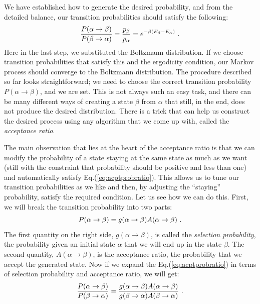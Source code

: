 \par
We have established how to generate the desired probability, and from the detailed balance, our transition probabilities should satisfy the following:
\begin{equation}
	\frac{P(\alpha \rightarrow \beta)}{P(\beta \rightarrow \alpha)} = \frac{p_\beta}{p_\alpha} = e^{-\beta(E_\beta - E_\alpha)} \ .
	\label{eq:acptprobratio}
\end{equation}
Here in the last step, we substituted the Boltzmann distribution. If we choose transition probabilities that satisfy this and the ergodicity condition, our Markov process should converge to the Boltzmann distribution. The procedure described so far looks straightforward; we need to choose the correct transition probability $P(\alpha \rightarrow \beta)$, and we are set. This is not always such an easy task, and there can be many different ways of creating a state $\beta$ from $\alpha$ that still, in the end, does not produce the desired distribution. There is a trick that can help us construct the desired process using any algorithm that we come up with, called the \textit{acceptance ratio}.
\par
The main observation that lies at the heart of the acceptance ratio is that we can modify the probability of a state staying at the same state as much as we want (still with the constraint that probability should be positive and less than one) and automatically satisfy Eq.(\ref{eq:acptprobratio}). This allows us to tune our transition probabilities as we like and then, by adjusting the ``staying'' probability, satisfy the required condition. Let us see how we can do this. First, we will break the transition probability into two parts:
\begin{equation*}
	P(\alpha \rightarrow \beta) = g(\alpha \rightarrow \beta) A(\alpha \rightarrow \beta) \ .
\end{equation*}
The first quantity on the right side, $g(\alpha \rightarrow \beta)$, is called the \textit{selection probability}, the probability given an initial state $\alpha$ that we will end up in the state $\beta$. The second quantity, $A(\alpha \rightarrow \beta)$, is the acceptance ratio, the probability that we accept the generated state. Now if we expand the Eq.(\ref{eq:acptprobratio}) in terms of selection probability and acceptance ratio, we will get:
\begin{equation}
	\frac{P(\alpha \rightarrow \beta)}{P(\beta \rightarrow \alpha)} = \frac{g(\alpha \rightarrow \beta) A(\alpha \rightarrow \beta)}{g(\beta \rightarrow \alpha) A(\beta \rightarrow \alpha)} \ .
	\label{eq:selecprobAcceptratio}
\end{equation}

